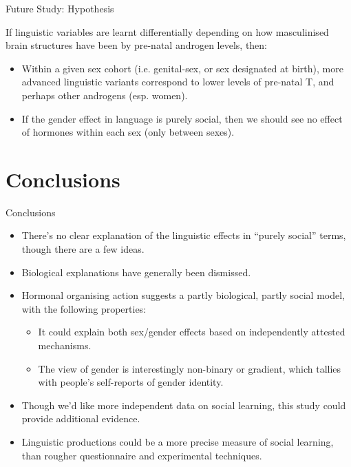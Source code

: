 \documentclass[hyperref={pdfpagelabels=false}]{beamer}
\begin{document}
\begin{frame}{Future Study: Hypothesis}

\begin{center}
\item If linguistic variables are learnt differentially depending on how masculinised brain structures have been by pre-natal androgen levels, then:
\end{center} 
\begin{itemize}
	\item Within a given sex cohort (i.e. genital-sex, or sex designated at birth), more advanced linguistic variants correspond to lower levels of pre-natal T, and perhaps other androgens (esp. women).
	\item If the gender effect in language is purely social, then we should see no effect of hormones within each sex (only between sexes).
\end{itemize}
\end{frame}





\section{Conclusions}


\begin{frame}{Conclusions}
		\begin{itemize}
			\item There's no clear explanation of the linguistic effects in ``purely social'' terms, though there are a few ideas.
			\item Biological explanations have generally been dismissed.
			\item Hormonal organising action suggests a partly biological, partly social model, with the following properties:
		\begin{itemize}
			\item It could explain both sex/gender effects based on independently attested mechanisms.
			\item The view of gender is interestingly non-binary or gradient, which tallies with people's self-reports of gender identity.
			\end{itemize}
			\item Though we'd like more independent data on social learning, this study could provide additional evidence.
			\item Linguistic productions could be a more precise measure of social learning, than rougher questionnaire and experimental techniques.
		
	\end{itemize}
\end{frame}
\end{document}
